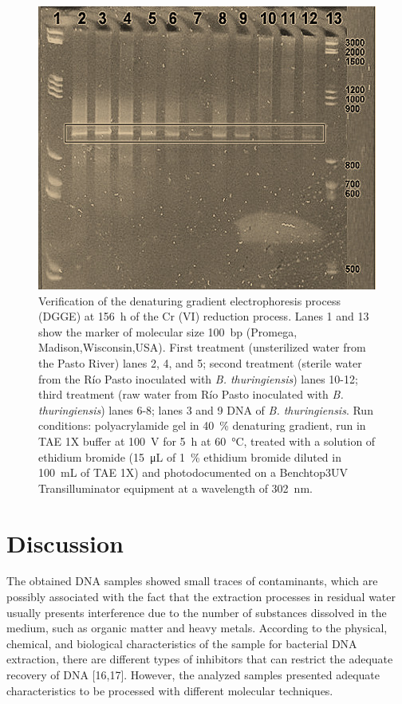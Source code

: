 \documentclass{univsciauth}
\begin{document}
\begin{figure}[t!]
        \centering
        \includegraphics[height=0.6\textwidth]{figures/Figure3.jpg}
        \caption{
                Verification of the denaturing gradient
                electrophoresis process (DGGE) at \SI{156}{h} of the Cr (VI)
                reduction process. Lanes 1 and 13 show the marker of molecular
                size \SI{100}{bp} (Promega, Madison,Wisconsin,USA). First treatment
                (unsterilized water from the Pasto River) lanes 2, 4, and 5;
                second treatment (sterile water from the Río Pasto inoculated
                with \emph{B. thuringiensis}) lanes 10-12; third treatment
                (raw water from Río Pasto inoculated with \emph{B.
                thuringiensis}) lanes 6-8; lanes 3 and 9 DNA of \emph{B.
        thuringiensis}. Run conditions: polyacrylamide gel in \SI{40}{\%} denaturing
        gradient, run in TAE 1X buffer at \SI{100}{V} for \SI{5}{h} at \SI{60}{\celsius},
        treated with a solution of ethidium bromide (\SI{15}{\micro L} of \SI{1}{\%} ethidium
        bromide diluted in \SI{100}{mL} of TAE 1X) and photodocumented on a
        Benchtop3UV Transilluminator equipment at a wavelength of \SI{302}{nm}.
        }
        \label{fig:3}
\end{figure}

\section{Discussion}

The obtained DNA samples showed small traces of contaminants, which are
possibly associated with the fact that the extraction processes in
residual water usually presents interference due to the number of
substances dissolved in the medium, such as organic matter and heavy
metals. According to the physical, chemical, and biological
characteristics of the sample for bacterial DNA extraction, there are
different types of inhibitors that can restrict the adequate recovery of
DNA {[}16,17{]}. However, the analyzed samples presented adequate
characteristics to be processed with different molecular techniques.
\end{document}

